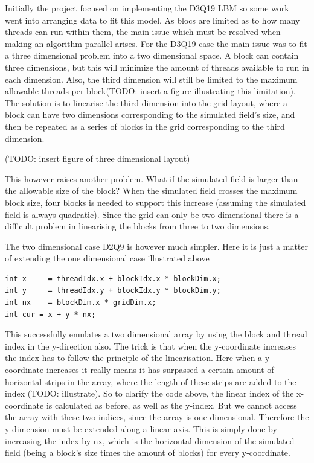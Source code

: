 Initially the project focused on implementing the D3Q19 LBM so some work went into arranging data to fit this model. As blocs are limited as to how many threads can run within them, the main issue which must be resolved when making an algorithm parallel arises. For the D3Q19 case the main issue was to fit a three dimensional problem into a two dimensional space. A block can contain three dimensions, but this will minimize the amount of threads available to run in each dimension. Also, the third dimension will still be limited to the maximum allowable threads per block(TODO: insert a figure illustrating this limitation). The solution is to linearise the third dimension into the grid layout, where a block can have two dimensions corresponding to the simulated field's size, and then be repeated as a series of blocks in the grid corresponding to the third dimension.

(TODO: insert figure of three dimensional layout)

This however raises another problem. What if the simulated field is larger than the allowable size of the block? When the simulated field crosses the maximum block size, four blocks is needed to support this increase (assuming the simulated field is always quadratic). Since the grid can only be two dimensional there is a difficult problem in linearising the blocks from three to two dimensions.

The two dimensional case D2Q9 is however much simpler. Here it is just a matter of extending the one dimensional case illustrated above

\begin{verbatim}
int x     = threadIdx.x + blockIdx.x * blockDim.x;
int y     = threadIdx.y + blockIdx.y * blockDim.y;
int nx    = blockDim.x * gridDim.x;
int cur = x + y * nx;
\end{verbatim}

This successfully emulates a two dimensional array by using the block and thread index in the y-direction also. The trick is that when the y-coordinate increases the index has to follow the principle of the linearisation. Here when a y-coordinate increases it really means it has surpassed a certain amount of horizontal strips in the array, where the length of these strips are added to the index (TODO: illustrate). So to clarify the code above, the linear index of the x-coordinate is calculated as before, as well as the y-index. But we cannot access the array with these two indices, since the array is one dimensional. Therefore the y-dimension must be extended along a linear axis. This is simply done by increasing the index by nx, which is the horizontal dimension of the simulated field (being a block's size times the amount of blocks) for every y-coordinate.

